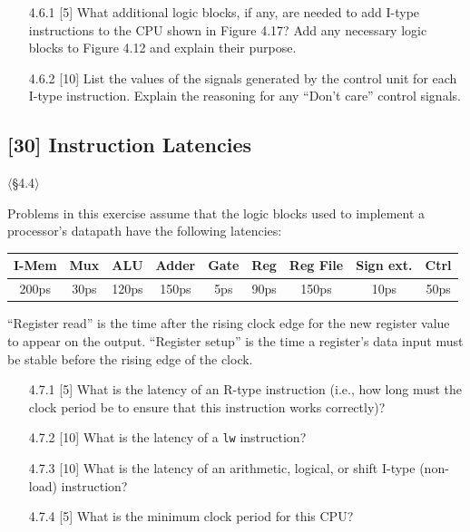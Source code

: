 \begin{enumerate}
  \item[4.6.1] [5] What additional logic blocks, if any, are needed to add
        I-type instructions to the CPU shown in Figure 4.17? Add any
        necessary logic blocks to Figure 4.12 and explain their purpose.
  \item[4.6.2] [10] List the values of the signals generated by the control
        unit for each I-type instruction. Explain the reasoning for any
        ``Don't care'' control signals.
\end{enumerate}

\problembreak

\subsection{[30] Instruction Latencies}
\hypertarget{prob-4.7}{}
\noindent$\langle$\S4.4$\rangle$\medskip

\noindent Problems in this exercise assume that the logic blocks used to
implement a processor's datapath have the following latencies:

\begin{center}
\begin{tabular}{ccccccccc}
\toprule
\textbf{I-Mem} & \textbf{Mux} & \textbf{ALU} & \textbf{Adder} &
\textbf{Gate} & \textbf{Reg} & \textbf{Reg File} &
\textbf{Sign ext.} & \textbf{Ctrl} \\
\midrule
200ps & 30ps & 120ps & 150ps & 5ps & 90ps & 150ps & 10ps & 50ps \\
\bottomrule
\end{tabular}
\end{center}

\noindent ``Register read'' is the time after the rising clock edge for the
new register value to appear on the output. ``Register setup'' is the time a
register's data input must be stable before the rising edge of the clock.

\begin{enumerate}
  \item[4.7.1] [5] What is the latency of an R-type instruction (i.e., how
        long must the clock period be to ensure that this instruction works
        correctly)?
  \item[4.7.2] [10] What is the latency of a \texttt{lw} instruction?
  \item[4.7.3] [10] What is the latency of an arithmetic, logical, or shift
        I-type (non-load) instruction?
  \item[4.7.4] [5] What is the minimum clock period for this CPU?
\end{enumerate}

